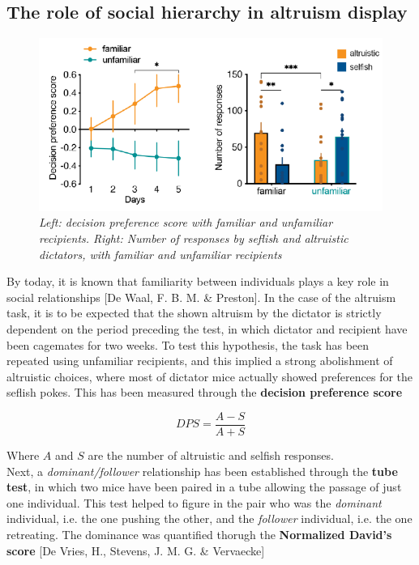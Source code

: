 \documentclass[a4paper]{article}
\begin{document}
\subsection{The role of social hierarchy in altruism display}

\begin{figure}[H]
	\begin{center}
		\includegraphics[scale=0.6]{familiar.png} 
	\end{center} 
	\caption{\textit{Left: decision preference score with familiar and unfamiliar recipients. Right: Number of responses by seflish and altruistic dictators, with familiar and unfamiliar recipients}}
	
\end{figure}

By today, it is known that familiarity between individuals plays a key role in social relationships [De Waal, F. B. M. \& Preston]. In the case of the altruism task, it is to be expected that the shown altruism by the dictator is strictly dependent on the period preceding the test, in which dictator and recipient have been cagemates for two weeks. To test this hypothesis, the task has been repeated using unfamiliar recipients, and this implied a strong abolishment of altruistic choices, where most of dictator mice actually showed preferences for the seflish pokes. This has been measured through the \textbf{decision preference score} 

\begin{equation}
DPS = \frac{A -S}{A+S}
\end{equation}

Where $A$ and $S$ are the number of altruistic and selfish responses.\\
Next, a \textit{dominant/follower} relationship has been established through the \textbf{tube test}, in which two mice have been paired in a tube allowing the passage of just one individual. This test helped to figure in the pair who was the \textit{dominant} individual, i.e. the one pushing the other, and the \textit{follower} individual, i.e. the one retreating. The dominance was quantified thorugh the \textbf{Normalized David's score} [De Vries, H., Stevens, J. M. G. \& Vervaecke]
\end{document}
